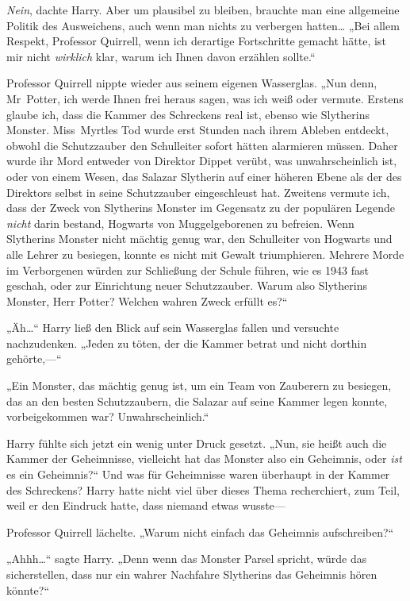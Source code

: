 {\emph{Nein}, dachte Harry. Aber um plausibel zu bleiben, brauchte man eine allgemeine Politik des Ausweichens, auch wenn man nichts zu verbergen hatten… „Bei allem Respekt, Professor Quirrell, wenn ich derartige Fortschritte gemacht hätte, ist mir nicht \emph{wirklich} klar, warum ich Ihnen davon erzählen sollte.“

Professor Quirrell nippte wieder aus seinem eigenen Wasserglas. „Nun denn, Mr~Potter, ich werde Ihnen frei heraus sagen, was ich weiß oder vermute. Erstens glaube ich, dass die Kammer des Schreckens real ist, ebenso wie Slytherins Monster. Miss~Myrtles Tod wurde erst Stunden nach ihrem Ableben entdeckt, obwohl die Schutzzauber den Schulleiter sofort hätten alarmieren müssen. Daher wurde ihr Mord entweder von Direktor Dippet verübt, was unwahrscheinlich ist, oder von einem Wesen, das Salazar Slytherin auf einer höheren Ebene als der des Direktors selbst in seine Schutzzauber eingeschleust hat. Zweitens vermute ich, dass der Zweck von Slytherins Monster im Gegensatz zu der populären Legende \emph{nicht} darin bestand, Hogwarts von Muggelgeborenen zu befreien. Wenn Slytherins Monster nicht mächtig genug war, den Schulleiter von Hogwarts und alle Lehrer zu besiegen, konnte es nicht mit Gewalt triumphieren. Mehrere Morde im Verborgenen würden zur Schließung der Schule führen, wie es 1943 fast geschah, oder zur Einrichtung neuer Schutzzauber. Warum also Slytherins Monster, Herr Potter? Welchen wahren Zweck erfüllt es?“

„Äh…“ Harry ließ den Blick auf sein Wasserglas fallen und versuchte nachzudenken. „Jeden zu töten, der die Kammer betrat und nicht dorthin gehörte,—“

„Ein Monster, das mächtig genug ist, um ein Team von Zauberern zu besiegen, das an den besten Schutzzaubern, die Salazar auf seine Kammer legen konnte, vorbeigekommen war? Unwahrscheinlich.“

Harry fühlte sich jetzt ein wenig unter Druck gesetzt. „Nun, sie heißt auch die Kammer der Geheimnisse, vielleicht hat das Monster also ein Geheimnis, oder \emph{ist} es ein Geheimnis?“ Und was für Geheimnisse waren überhaupt in der Kammer des Schreckens? Harry hatte nicht viel über dieses Thema recherchiert, zum Teil, weil er den Eindruck hatte, dass niemand etwas wusste—

Professor Quirrell lächelte. „Warum nicht einfach das Geheimnis aufschreiben?“

„Ahhh…“ sagte Harry. „Denn wenn das Monster Parsel spricht, würde das sicherstellen, dass nur ein wahrer Nachfahre Slytherins das Geheimnis hören könnte?“

}
